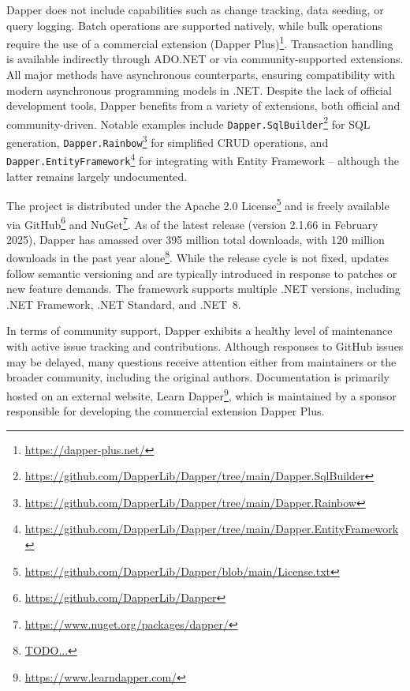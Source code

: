 Dapper does not include capabilities such as change tracking, data seeding, or query logging. Batch operations are supported natively, while bulk operations require the use of a commercial extension (Dapper Plus)\footnote{\url{https://dapper-plus.net/}}. Transaction handling is available indirectly through ADO.NET or via community-supported extensions. All major methods have asynchronous counterparts, ensuring compatibility with modern asynchronous programming models in .NET. Despite the lack of official development tools, Dapper benefits from a variety of extensions, both official and community-driven. Notable examples include \texttt{Dapper.SqlBuilder}\footnote{\url{https://github.com/DapperLib/Dapper/tree/main/Dapper.SqlBuilder}} for SQL generation, \texttt{Dapper.Rainbow}\footnote{\url{https://github.com/DapperLib/Dapper/tree/main/Dapper.Rainbow}} for simplified CRUD operations, and \texttt{Dapper.EntityFramework}\footnote{\url{https://github.com/DapperLib/Dapper/tree/main/Dapper.EntityFramework}} for integrating with Entity Framework -- although the latter remains largely undocumented.

The project is distributed under the Apache 2.0 License\footnote{\url{https://github.com/DapperLib/Dapper/blob/main/License.txt}} and is freely available via GitHub\footnote{\url{https://github.com/DapperLib/Dapper}} and NuGet\footnote{\url{https://www.nuget.org/packages/dapper/}}. As of the latest release (version 2.1.66 in February 2025), Dapper has amassed over 395 million total downloads, with 120 million downloads in the past year alone\footnote{\url{TODO...}}. While the release cycle is not fixed, updates follow semantic versioning and are typically introduced in response to patches or new feature demands. The framework supports multiple .NET versions, including .NET Framework, .NET Standard, and .NET~8.

In terms of community support, Dapper exhibits a healthy level of maintenance with active issue tracking and contributions. Although responses to GitHub issues may be delayed, many questions receive attention either from maintainers or the broader community, including the original authors. Documentation is primarily hosted on an external website, Learn Dapper\footnote{\url{https://www.learndapper.com/}}, which is maintained by a sponsor responsible for developing the commercial extension Dapper Plus.

